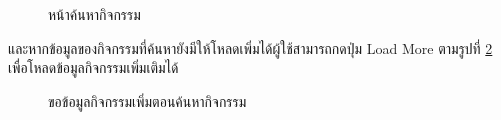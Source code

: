 \documentclass[14pt,oneside,openright,a4paper]{cpe-thai-project}
\begin{document}
\begin{figure}[H]\centering
  \setlength{\fboxrule}{0.5mm}
  \setlength{\fboxsep}{0.5cm}
  \caption{หน้าค้นหากิจกรรม}\label{fig:6}
 \end{figure}

และหากข้อมูลของกิจกรรมที่ค้นหายังมีให้โหลดเพิ่มได้ผู้ใช้สามารถกดปุ่ม Load More ตามรูปที่ \ref{fig:LoadSearchAct} เพื่อโหลดข้อมูลกิจกรรมเพิ่มเติมได้
\begin{figure}[H]\centering
  \setlength{\fboxrule}{0.5mm}
  \setlength{\fboxsep}{0.5cm}
  \caption{ขอข้อมูลกิจกรรมเพิ่มตอนค้นหากิจกรรม}\label{fig:LoadSearchAct}
 \end{figure}
\end{document}
